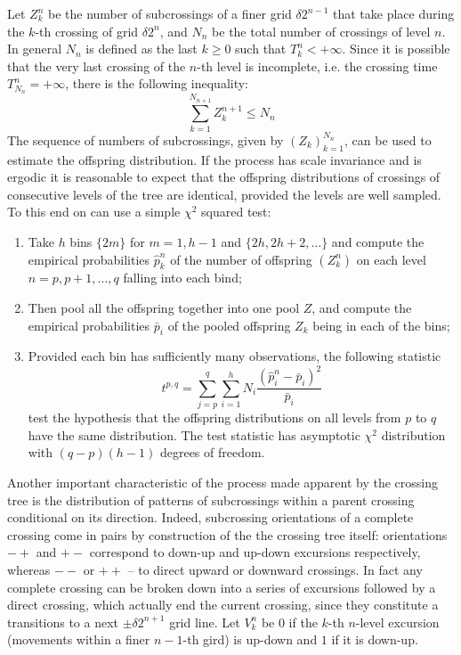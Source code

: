 Let $Z_k^n$ be the number of subcrossings of a finer grid $\delta 2^{n-1}$ that take
place during the $k$-th crossing of grid $\delta 2^n$, and $N_n$ be the total number
of crossings of level $n$. In general $N_n$ is defined as the last $k\geq0$ such that
$T_k^n < +\infty$. Since it is possible that the very last crossing of the $n$-th
level is incomplete, i.e. the crossing time $T_{N_n}^n = +\infty$, there is the following
inequality:
\[ \sum_{k=1}^{N_{n+1}} Z_k^{n+1} \leq N_n \]
The sequence of numbers of subcrossings, given by $(Z_k)_{k=1}^{N_n}$, can be used to
estimate the offspring distribution. If the process has scale invariance and is ergodic
it is reasonable to expect that the offspring distributions of crossings of consecutive
levels of the tree are identical, provided the levels are well sampled. To this end on
can use a simple $\chi^2$ squared test: \begin{enumerate}
    \item Take $h$ bins $\{2m\}$ for $m = 1,h-1$ and $\{2h, 2h+2,\ldots\}$ and compute
    the empirical probabilities $\hat{p}_k^n$ of the number of offspring $(Z_k^n)$ on
    each level $n=p, p+1, \ldots, q$ falling into each bind;
    \item Then pool all the offspring together into one pool $Z$, and compute the empirical
    probabilities $\bar{p}_i$ of the pooled offspring $Z_k$ being in each of the bins;
    \item Provided each bin has sufficiently many observations, the following statistic
    \[ t^{p,q} = \sum_{j=p}^q \sum_{i=1}^h N_i \frac{(\hat{p}_i^n-\bar{p}_i)^2}{\bar{p}_i} \]
    test the hypothesis that the offspring distributions on all levels from $p$ to $q$
    have the same distribution. The test statistic has asymptotic $\chi^2$ distribution
    with $(q-p)(h-1)$ degrees of freedom.
\end{enumerate}

Another important characteristic of the process made apparent by the crossing tree
is the distribution of patterns of subcrossings within a parent crossing conditional
on its direction. Indeed, subcrossing orientations of a complete crossing come in
pairs by construction of the the crossing tree itself: orientations $-+$ and $+-$
correspond to down-up and up-down excursions respectively, whereas $--$ or $++$ -- to
direct upward or downward crossings. In fact any complete crossing can be broken down
into a series of excursions followed by a direct crossing, which actually end the
current crossing, since they constitute a transitions to a next $\pm\delta 2^{n+1}$
grid line. Let $V_k^n$ be $0$ if the $k$-th $n$-level excursion (movements within a finer
$n-1$-th gird) is up-down and $1$ if it is down-up.

